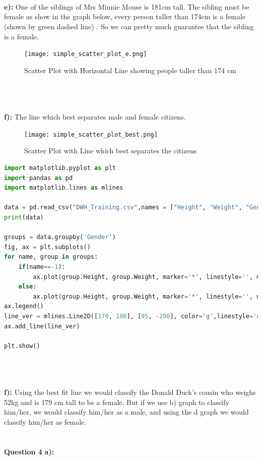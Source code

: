 \documentclass{article}
\begin{document}
\\~\\
\\
\textbf{e):} One of the siblings of Mrs Minnie Mouse is 181cm tall. The sibling must be female as show in the graph below, every person taller than 174cm is a female (shown by green dashed line) . So we can pretty much guarantee that the sibling is a female.
\begin{figure}[H]
\centering
    \texttt{[image: simple\_scatter\_plot\_e.png]}
\caption{Scatter Plot with Horizontal Line showing people taller than 174 cm}
\label{fig:scatter_plot5}
\end{figure}
\\~\\
\\
\textbf{f):} The line which best separates male and female citizens.
\begin{figure}[H]
\centering
    \texttt{[image: simple\_scatter\_plot\_best.png]}
\caption{Scatter Plot with Line which best separates the citizens}
\label{fig:scatter_plot6}
\end{figure}
\begin{lstlisting}[language=Python]
import matplotlib.pyplot as plt
import pandas as pd
import matplotlib.lines as mlines

data = pd.read_csv("DWH_Training.csv",names = ["Height", "Weight", "Gender"])
print(data)

groups = data.groupby('Gender')
fig, ax = plt.subplots()
for name, group in groups:
    if(name==-1):
        ax.plot(group.Height, group.Weight, marker='*', linestyle='', ms=12, label='Female')
    else:
        ax.plot(group.Height, group.Weight, marker='*', linestyle='', ms=12, label='Male')
ax.legend()
line_ver = mlines.Line2D([170, 180], [95, -200], color='g',linestyle='dashed')
ax.add_line(line_ver)

plt.show()

\end{lstlisting}
\\~\\
\\
\textbf{f):} Using the best fit line we would classify the Donald Duck's cousin who weighs 52kg and is 179 cm tall to be a female. But if we use b) graph to classify him/her, we would classify him/her as a male, and using the d graph we would classify him/her as female.
\\~\\
\\
\noindent\textbf{Question 4}\newline
\textbf{a):} 
\end{document}
